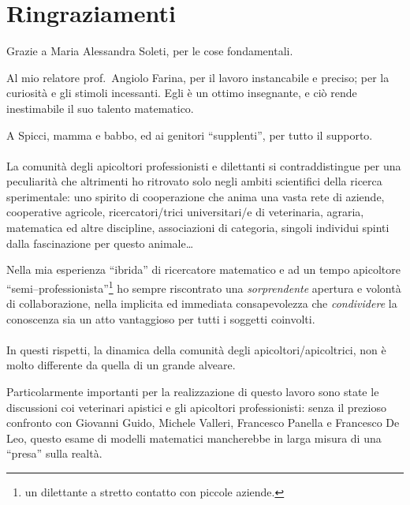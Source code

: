 \cleardoublepage
{} %
\section*{Ringraziamenti}
Grazie a Maria Alessandra Soleti, per le cose fondamentali.

Al mio relatore prof.~Angiolo Farina, per il lavoro instancabile e preciso; per la curiosità e gli stimoli incessanti.
Egli è un ottimo insegnante, e ciò rende inestimabile il suo talento matematico.

A Spicci, mamma e babbo, ed ai genitori ``supplenti'', per tutto il supporto.

\paragraph{}
La comunità degli apicoltori professionisti e dilettanti si contraddistingue per una peculiarità
che altrimenti ho ritrovato solo negli ambiti scientifici della ricerca sperimentale: uno spirito di cooperazione
che anima una vasta rete di aziende, cooperative agricole, ricercatori/trici universitari/e di veterinaria, agraria,
matematica ed altre discipline, associazioni di categoria, singoli individui spinti dalla fascinazione per
questo animale\dots

Nella mia esperienza ``ibrida'' di ricercatore matematico e ad un tempo
apicoltore ``semi--professionista''\footnote{\ie un dilettante a stretto contatto con piccole aziende.}
ho sempre riscontrato una \emph{sorprendente} apertura e volontà di collaborazione, nella implicita ed immediata
consapevolezza che \emph{condividere} la conoscenza sia un atto vantaggioso per tutti i soggetti coinvolti.

\paragraph{}
In questi rispetti, la dinamica della comunità degli apicoltori/apicoltrici, non è molto differente da
quella di un grande alveare.

Particolarmente importanti per la realizzazione di questo lavoro sono state le discussioni coi veterinari apistici
e gli apicoltori professionisti: senza il prezioso confronto con Giovanni Guido, Michele Valleri, Francesco Panella
e Francesco De Leo, questo esame di modelli matematici mancherebbe in larga misura di una ``presa'' sulla realtà.




